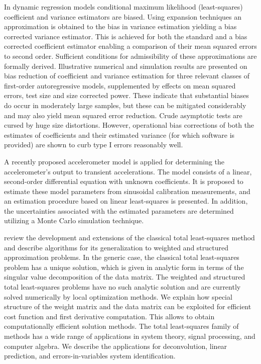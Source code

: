 \documentclass[11pt]{article}
\begin{document}
\citet{Kiviet14improved} In dynamic regression models conditional maximum likelihood (least-squares) coefficient and variance estimators are biased. Using expansion techniques an approximation is obtained to the bias in variance estimation yielding a bias corrected variance estimator. This is achieved for both the standard and a bias corrected coefficient estimator enabling a comparison of their mean squared errors to second order. Sufficient conditions for admissibility of these approximations are formally derived. Illustrative numerical and simulation results are presented on bias reduction of coefficient and variance estimation for three relevant classes of first-order autoregressive models, supplemented by effects on mean squared errors, test size and size corrected power. These indicate that substantial biases do occur in moderately large samples, but these can be mitigated considerably and may also yield mean squared error reduction. Crude asymptotic tests are cursed by huge size distortions. However, operational bias corrections of both the estimates of coefficients and their estimated variance (for which software is provided) are shown to curb type I errors reasonably well.

\citet{Link07} A recently proposed accelerometer model is applied for determining the accelerometer's output to transient accelerations. The model consists of a linear, second-order differential equation with unknown coefficients. It is proposed to estimate these model parameters from sinusoidal calibration measurements, and an estimation procedure based on linear least-squares is presented. In addition, the uncertainties associated with the estimated parameters are determined utilizing a Monte Carlo simulation technique.

\citet{Markovsky07overview} review the development and extensions of the classical total least-squares method and describe algorithms for its generalization to weighted and structured approximation problems. In the generic case, the classical total least-squares problem has a unique solution, which is given in analytic form in terms of the singular value decomposition of the data matrix. The weighted and structured total least-squares problems have no such analytic solution and are currently solved numerically by local optimization methods. We explain how special structure of the weight matrix and the data matrix can be exploited for efficient cost function and first derivative computation. This allows to obtain computationally efficient solution methods. The total least-squares family of methods has a wide range of applications in system theory, signal processing, and computer algebra. We describe the applications for deconvolution, linear prediction, and errors-in-variables system identification.
\end{document}
